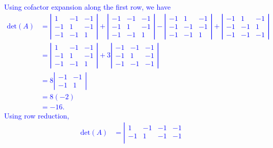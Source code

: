 \documentclass[a4paper,11pt]{article}
\newcommand{\BB}[1]{\textcolor{blue}{#1}}
\begin{document}
\begin{enumerate}[(a)]
  \BB{Using cofactor expansion along the first row, we have
    \begin{align*}
      \text{det}(A) &=
      \left|
      \begin{array}{rrr}
        1 & -1 & -1 \\ -1 & 1 & -1 \\ -1 & -1 & 1
      \end{array}
      \right| + 
      \left|
      \begin{array}{rrr}
        -1 & -1 & -1 \\ -1 & 1 & -1 \\ -1 & -1 & 1
      \end{array}
      \right| -
      \left|
      \begin{array}{rrr}
        -1 & 1 & -1 \\ -1 & -1 & -1 \\ -1 & -1 & 1
      \end{array}
      \right| +
      \left|
      \begin{array}{rrr}
        -1 & 1 & -1 \\ -1 & -1 & 1 \\ -1 & -1 & -1
      \end{array}
      \right| \\
      &=
      \left|
      \begin{array}{rrr}
        1 & -1 & -1 \\ -1 & 1 & -1 \\ -1 & -1 & 1
      \end{array}
      \right| + 3
      \left|
      \begin{array}{rrr}
        -1 & -1 & -1 \\ -1 & 1 & -1 \\ -1 & -1 & -1
      \end{array}
      \right| \\
      &=
      8\left|
      \begin{array}{rr}
        -1 & -1 \\ -1 & 1
      \end{array}
      \right| \\
          &= 8(-2) \\
          &= -16.
    \end{align*}
    Using row reduction,
    \begin{align*}
      \text{det}(A) &=
      \left|
      \begin{array}{rrrr}
        1 & -1 & -1 & -1 \\
        -1 & 1 & -1 & -1 \\

\end{array}
\end{align*}}
\end{enumerate}
\end{document}
